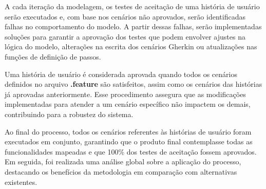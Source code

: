 A cada iteração da modelagem, os testes de aceitação de uma história de usuário serão executados e, com base nos cenários não aprovados, serão identificadas falhas 
no comportamento do modelo. A partir dessas falhas, serão implementadas soluções para garantir a aprovação dos testes que podem envolver ajustes na lógica do modelo, 
alterações na escrita dos cenários Gherkin ou atualizações nas funções de definição de passos.

Uma história de usuário é considerada aprovada quando todos os cenários definidos no arquivo \textbf{.feature} são satisfeitos, assim como os cenários das histórias já 
aprovadas anteriormente. Esse procedimento assegura que as modificações implementadas para atender a um cenário específico não impactem os demais, contribuindo para a 
robustez do sistema.

Ao final do processo, todos os cenários referentes às histórias de usuário foram executados em conjunto, garantindo que o produto final contemplasse todas as 
funcionalidades mapeadas e que 100\% dos testes de aceitação fossem aprovados. Em seguida, foi realizada uma análise global sobre a aplicação do processo, destacando 
os benefícios da metodologia em comparação com alternativas existentes.




